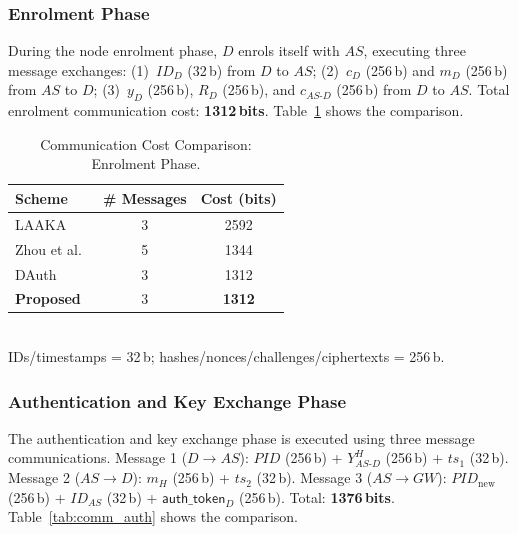 \subsubsection{Enrolment Phase}

During the node enrolment phase, $D$ enrols itself with $AS$, executing three message
exchanges: (1)~$ID_D$ (32\,b) from $D$ to $AS$; (2)~$c_D$ (256\,b) and $m_D$
(256\,b) from $AS$ to $D$; (3)~$y_D$ (256\,b), $R_D$ (256\,b), and $c_{AS\text{-}D}$
(256\,b) from $D$ to $AS$.
Total enrolment communication cost: \textbf{1312\,bits}.
Table~\ref{tab:comm_enroll} shows the comparison.

\begin{table}[!ht]
  \centering
  \caption{Communication Cost Comparison: Enrolment Phase.}
  \label{tab:comm_enroll}
  \small
  \setlength{\tabcolsep}{6pt}
  \begin{tabular}{lcc}
    \toprule
    Scheme & \# Messages & Cost (bits) \\
    \midrule
    LAAKA~\cite{ali2024laaka}          & 3 & 2592 \\
    Zhou et al.~\cite{zhou2024auth}    & 5 & 1344 \\
    DAuth~\cite{das2026comsnets}        & 3 & 1312 \\
    \textbf{Proposed}                  & 3 & \textbf{1312} \\
    \bottomrule
  \end{tabular}\\[4pt]
  \small IDs/timestamps = 32\,b; hashes/nonces/challenges/ciphertexts = 256\,b.
\end{table}

\subsubsection{Authentication and Key Exchange Phase}

The authentication and key exchange phase is executed using three message
communications.
Message 1 ($D \to AS$): $\mathit{PID}$ (256\,b) + $Y_{AS\text{-}D}^H$ (256\,b) +
$ts_1$ (32\,b).
Message 2 ($AS \to D$): $m_H$ (256\,b) + $ts_2$ (32\,b).
Message 3 ($AS \to GW$): $\mathit{PID}_{\mathrm{new}}$ (256\,b) + $ID_{AS}$ (32\,b)
+ $\mathsf{auth\_token}_D$ (256\,b).
Total: \textbf{1376\,bits}.
Table~\ref{tab:comm_auth} shows the comparison.

